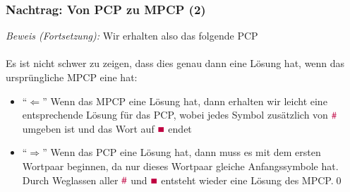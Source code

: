 \documentclass[aspectratio=1610,onlymath]{beamer}
\begin{document}
\begin{frame}[t]\frametitle{Nachtrag: Von PCP zu MPCP (2)}

% 

\emph{Beweis (Fortsetzung):} Wir erhalten also das folgende PCP\\[1ex]
\\[1ex]
%
Es ist nicht schwer zu zeigen, dass dies genau dann eine Lösung hat, wenn das ursprüngliche MPCP eine hat:\pause
\begin{itemize}
\item "`$\Leftarrow$"' Wenn das MPCP eine Lösung hat, dann erhalten wir leicht eine entsprechende Lösung für das PCP, wobei jedes Symbol zusätzlich von $\mathtt{\textcolor{purple}{\#}}$ umgeben ist und das Wort auf $\mathtt{\textcolor{purple}{\blacksquare}}$ endet\pause
\item "`$\Rightarrow$"' Wenn das PCP eine Lösung hat, dann muss es mit dem ersten Wortpaar beginnen, da nur dieses Wortpaar gleiche Anfangssymbole hat. Durch Weglassen aller $\mathtt{\textcolor{purple}{\#}}$ und 
$\mathtt{\textcolor{purple}{\blacksquare}}$ entsteht wieder eine Lösung des MPCP.\qed
\end{itemize}

\end{frame}


\end{document}
